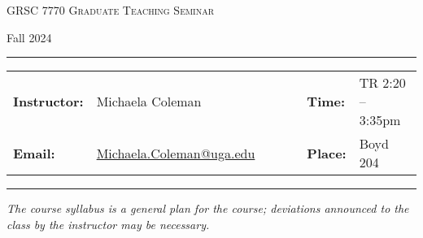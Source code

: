 \documentclass[11pt, a4paper]{article}
\begin{document}
\begin{center}
{\Large \textsc{GRSC 7770 Graduate Teaching Seminar}}
\end{center}
\begin{center}
Fall 2024
\end{center}


\begin{center}
\rule{6in}{0.4pt}
\begin{minipage}[t]{.75\textwidth}
\begin{tabular}{llcccll}
\textbf{Instructor:} & Michaela Coleman & & &  & \textbf{Time:} & TR 2:20 -- 3:35pm \\
\textbf{Email:} &  \href{Michaela Coleman}{Michaela.Coleman@uga.edu} & & & & \textbf{Place:} & Boyd 204
\end{tabular}
\end{minipage}
\rule{6in}{0.4pt}
\end{center}
\vspace{.5cm}
\setlength{\unitlength}{1in}
\renewcommand{\arraystretch}{2}

\textit{The course syllabus is a general plan for the course; deviations
announced to the class by the instructor may be necessary.}
\end{document}

